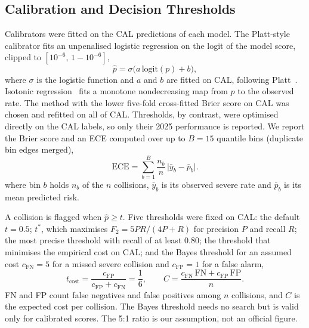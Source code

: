\documentclass[conference,letterpaper]{IEEEtran}
\begin{document}
\subsection{Calibration and Decision Thresholds}

Calibrators were fitted on the CAL predictions of each model. The Platt-style calibrator fits an unpenalised logistic regression on the logit of the model score, clipped to $[10^{-6},\,1-10^{-6}]$,
\begin{equation}
\hat p = \sigma\big(a\,\mathrm{logit}(p) + b\big),
\label{eq:platt}
\end{equation}
where $\sigma$ is the logistic function and $a$ and $b$ are fitted on CAL, following Platt~\cite{platt1999probabilistic}. Isotonic regression~\cite{zadrozny2002transforming} fits a monotone nondecreasing map from $p$ to the observed rate. The method with the lower five-fold cross-fitted Brier score on CAL was chosen and refitted on all of CAL. Thresholds, by contrast, were optimised directly on the CAL labels, so only their 2025 performance is reported. We report the Brier score and an ECE computed over up to $B=15$ quantile bins (duplicate bin edges merged),
\begin{equation}
\mathrm{ECE} = \sum_{b=1}^{B} \frac{n_b}{n}\,\big|\bar y_b - \bar p_b\big|.
\label{eq:ece}
\end{equation}
where bin $b$ holds $n_b$ of the $n$ collisions, $\bar y_b$ is its observed severe rate and $\bar p_b$ is its mean predicted risk.

A collision is flagged when $\hat p \ge t$. Five thresholds were fixed on CAL: the default $t=0.5$; $t^{*}$, which maximises $F_2 = 5PR/(4P+R)$ for precision $P$ and recall $R$; the most precise threshold with recall of at least 0.80; the threshold that minimises the empirical cost on CAL; and the Bayes threshold for an assumed cost $c_{\mathrm{FN}}=5$ for a missed severe collision and $c_{\mathrm{FP}}=1$ for a false alarm,
\begin{equation}
t_{\mathrm{cost}} = \frac{c_{\mathrm{FP}}}{c_{\mathrm{FP}}+c_{\mathrm{FN}}} = \frac{1}{6}, \qquad
C = \frac{c_{\mathrm{FN}}\,\mathrm{FN} + c_{\mathrm{FP}}\,\mathrm{FP}}{n}.
\label{eq:cost}
\end{equation}
FN and FP count false negatives and false positives among $n$ collisions, and $C$ is the expected cost per collision. The Bayes threshold needs no search but is valid only for calibrated scores. The 5:1 ratio is our assumption, not an official figure.

\end{document}

